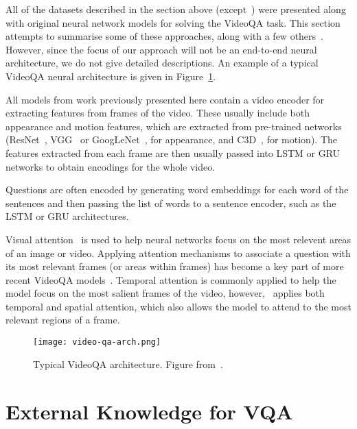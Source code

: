 \documentclass[../interim.tex]{subfiles}
\begin{document}
All of the datasets described in the section above (except~\cite{dataset:ego-vqa}) were presented along with original neural network models for solving the VideoQA task. This section attempts to summarise some of these approaches, along with a few others~\cite{videoqa:co-mem, videoqa:cwd, videoqa:mm-att, videoqa:strr}. However, since the focus of our approach will not be an end-to-end neural architecture, we do not give detailed descriptions. An example of a typical VideoQA neural architecture is given in Figure~\ref{fig:video-qa-arch}.

All models from work previously presented here contain a video encoder for extracting features from frames of the video. These usually include both appearance and motion features, which are extracted from pre-trained networks (ResNet~\cite{resnet}, VGG~\cite{vgg} or GoogLeNet~\cite{googlenet}, for appearance, and C3D~\cite{c3d}, for motion). The features extracted from each frame are then usually passed into LSTM or GRU networks to obtain encodings for the whole video.

Questions are often encoded by generating word embeddings for each word of the sentences and then passing the list of words to a sentence encoder, such as the LSTM or GRU architectures.

Visual attention~\cite{visual-attention} is used to help neural networks focus on the most relevent areas of an image or video. Applying attention mechanisms to associate a question with its most relevant frames (or areas within frames) has become a key part of more recent VideoQA models~\cite{dataset:tgif-qa, dataset:xu, dataset:youtube2text-qa, dataset:tvqa, videoqa:co-mem, videoqa:cwd, videoqa:mm-att, dataset:pororo-qa}. Temporal attention is commonly applied to help the model focus on the most salient frames of the video, however,~\cite{dataset:tgif-qa} applies both temporal and spatial attention, which also allows the model to attend to the most relevant regions of a frame.

\begin{figure}
  \centering
  \texttt{[image: video-qa-arch.png]}
  \caption{Typical VideoQA architecture. Figure from~\cite{dataset:ego-vqa}.}
  \label{fig:video-qa-arch}
\end{figure}


\section{External Knowledge for VQA}
\end{document}

